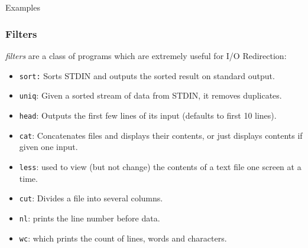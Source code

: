 \documentclass[10pt]{beamer}
\begin{document}
\subsection{}
\begin{frame}[fragile]{Examples}
\frametitle{Filters}
\emph{filters} are a class of programs which are extremely useful for I/O Redirection:\vspace{0.1in}
\begin{itemize} 
\item \texttt{sort:} Sorts STDIN and outputs the sorted result on standard output.\vspace{0.05in}
\item \texttt{uniq}: Given a sorted stream of data from STDIN, it removes duplicates.\vspace{0.05in}
\item \texttt{head}: Outputs the first few lines of its input (defaults to first 10 lines).\vspace{0.05in}
\item \texttt{cat}: Concatenates files and displays their contents, or just displays contents if given one input.\vspace{0.05in}
\item \texttt{less}: used to view (but not change) the contents of a text file one screen at a time.\vspace{0.05in}
\item \texttt{cut}: Divides a file into several columns.\vspace{0.05in}
\item \texttt{nl}: prints the line number before data.\vspace{0.05in}
\item \texttt{wc}: which prints the count of lines, words and characters.\vspace{0.05in}
\end{itemize}
\end{frame}
\end{document}
